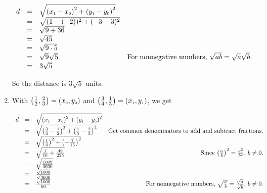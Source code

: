 \documentclass{ximera}
\begin{document}
\begin{example}
\begin{enumerate}
\setlength{\extrarowheight}{3pt}

\[ \begin{array}{rclr}

 d & = & \sqrt{\left(x_{\mbox{\tiny$1$}} - x_{\mbox{\tiny$0$}} \right)^2 + \left(y_{\mbox{\tiny$1$}} - y_{\mbox{\tiny$0$}} \right)^2} & \\
   & = & \sqrt{ (1-(-2))^2 + (-3-3)^2} & \\
   & = & \sqrt{9 + 36} & \\
   & = & \sqrt{45} & \\
   & = & \sqrt{9 \cdot 5} & \\
   & = & \sqrt{9} \sqrt{5} & \text{For nonnegative numbers, $\sqrt{ab} = \sqrt{a} \sqrt{b}$.} \\
   & = & 3 \sqrt{5} &  \end{array} \]

\setlength{\extrarowheight}{2pt}

\medskip

So the distance is $3 \sqrt{5}$ units.

\item With $\left( \frac{1}{2}, \frac{2}{3}\right) =  \left(x_{\mbox{\tiny$0$}}, y_{\mbox{\tiny$0$}}\right)$ and  $\left( \frac{3}{4}, \frac{1}{5}\right) = \left(x_{\mbox{\tiny$1$}}, y_{\mbox{\tiny$1$}}\right)$, we get

\setlength{\extrarowheight}{3pt}

\[ \begin{array}{rclr}

 d & = & \sqrt{\left(x_{\mbox{\tiny$1$}} - x_{\mbox{\tiny$0$}} \right)^2 + \left(y_{\mbox{\tiny$1$}} - y_{\mbox{\tiny$0$}} \right)^2} & \\
   & = & \sqrt{ \left(\frac{3}{4}-\frac{1}{2} \right)^2 + \left(\frac{1}{5} - \frac{2}{3} \right)^2} &  \text{Get common denominators to add and subtract fractions.}\\
   & = & \sqrt{\left(\frac{1}{4} \right)^2 + \left(-\frac{7}{15} \right)^2} &\\
   & = & \sqrt{\frac{1}{16} + \frac{49}{225}} &  \text{ Since $\left(\frac{a}{b}\right)^2 = \frac{a^2}{b^2}$, $b \neq 0$.}\\
   & = & \sqrt{\frac{1009}{3600}} & \\
   & = & \frac{\sqrt{1009}}{\sqrt{3600}} &  \\
   & = & \frac{\sqrt{1009}}{60} & \text{For nonnegative numbers, $\sqrt{\frac{a}{b}} = \frac{\sqrt{a}}{\sqrt{b}}$, $b \neq 0$.} \end{array} \]


\end{enumerate}
\end{example}
\end{document}
